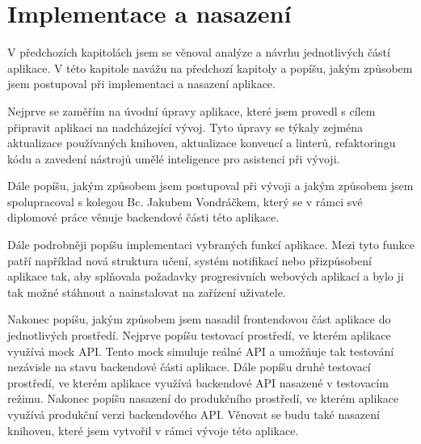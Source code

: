 \chapter{Implementace a nasazení}

V předchozích kapitolách jsem se věnoval analýze a návrhu jednotlivých částí aplikace. V této kapitole navážu na předchozí kapitoly a popíšu, jakým způsobem jsem postupoval při implementaci a nasazení aplikace.

Nejprve se zaměřím na úvodní úpravy aplikace, které jsem provedl s cílem připravit aplikaci na nadcházející vývoj. Tyto úpravy se týkaly zejména aktualizace používaných knihoven, aktualizace konvencí a linterů, refaktoringu kódu a zavedení nástrojů umělé inteligence pro asistenci při vývoji.

Dále popíšu, jakým způsobem jsem postupoval při vývoji a jakým způsobem jsem spolupracoval s kolegou Bc. Jakubem Vondráčkem, který se v rámci své diplomové práce věnuje backendové části této aplikace.

Dále podrobněji popíšu implementaci vybraných funkcí aplikace. Mezi tyto funkce patří například nová struktura učení, systém notifikací nebo přizpůsobení aplikace tak, aby splňovala požadavky progresivních webových aplikací a bylo ji tak možné stáhnout a nainstalovat na zařízení uživatele.

Nakonec popíšu, jakým způsobem jsem nasadil frontendovou část aplikace do jednotlivých prostředí. Nejprve popíšu testovací prostředí, ve kterém aplikace využívá mock API. Tento mock simuluje reálné API a umožňuje tak testování nezávisle na stavu backendové části aplikace. Dále popíšu druhé testovací prostředí, ve kterém aplikace využívá backendové API nasazené v testovacím režimu. Nakonec popíšu nasazení do produkčního prostředí, ve kterém aplikace využívá produkční verzi backendového API. Věnovat se budu také nasazení knihoven, které jsem vytvořil v rámci vývoje této aplikace.
